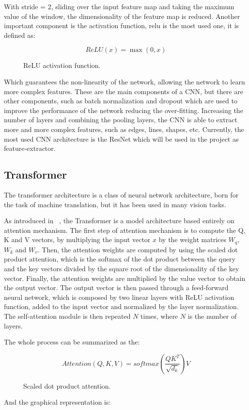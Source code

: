 With stride = 2, sliding over the input feature map and taking the maximum value of the window, the dimensionality of the feature map is reduced.
Another important component is the activation function, \gls{relu} is the most used one, it is defined as:
\begin{figure}[H]
    \[ReLU(x) = \max(0, x)\]
    \caption{ReLU activation function.}
    \label{fig:expression-relu}
\end{figure}
Which guarantees the non-linearity of the network, allowing the network to learn more complex features.
These are the main components of a CNN, but there are other components, such as batch normalization and dropout which are used to improve the performance of the network reducing the over-fitting.
Increasing the number of layers and combining the pooling layers, the CNN is able to extract more and more complex features, such as edges, lines, shapes, etc.
Currently, the most used CNN architecture is the ResNet which will be used in the project as feature-extractor.

\subsection{Transformer}\label{subsec:transformer}
The transformer architecture is a class of neural network architecture, born for the task of machine translation, but it has been used in many vision tasks.

As introduced in ~\cite{transformer_paper}, the Transformer is a model architecture based entirely on attention mechanism.
The first step of attention mechanism is to compute the Q, K and V vectors, by multiplying the input vector $x$ by the weight matrices $W_q$, $W_k$ and $W_v$.
Then, the attention weights are computed by using the scaled dot product attention, which is the softmax of the dot product between the query and the key vectors divided by the square root of the dimensionality of the key vector.
Finally, the attention weights are multiplied by the value vector to obtain the output vector.
The output vector is then passed through a feed-forward neural network, which is composed by two linear layers with ReLU activation function, added to the input vector and normalized by the layer normalization.
The self-attention module is then repeated $N$ times, where $N$ is the number of layers.

The whole process can be summarized as the:
\begin{figure}[H]
    \[Attention(Q, K, V) = softmax\left(\frac{QK^T}{\sqrt{d_k}}\right)V\]
    \caption{Scaled dot product attention.}
    \label{fig:expression-scaled-dot-product}
\end{figure}
And the graphical representation is:

